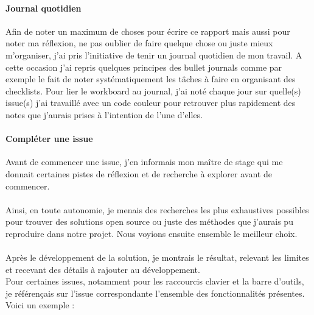 \documentclass[12pt]{article}
\begin{document}
\paragraph{Journal quotidien}
Afin de noter un maximum de choses pour écrire ce rapport mais aussi pour noter ma réflexion, ne pas oublier de faire quelque chose ou juste mieux m'organiser, j'ai pris l'initiative de tenir un journal quotidien de mon travail. A cette occasion j'ai repris quelques principes des bullet journals comme par exemple le fait de noter systématiquement les tâches à faire en organisant des checklists. Pour lier le workboard au journal, j'ai noté chaque jour sur quelle(s) issue(s) j'ai travaillé avec un code couleur pour retrouver plus rapidement des notes que j'aurais prises à l'intention de l'une d'elles.\\

\paragraph{Compléter une issue}
Avant de commencer une issue, j'en informais mon maître de stage qui me donnait certaines pistes de réflexion et de recherche à explorer avant de commencer.
\paragraph{}
Ainsi, en toute autonomie, je menais des recherches les plus exhaustives possibles pour trouver des solutions open source ou juste des méthodes que j'aurais pu reproduire dans notre projet. Nous voyions ensuite ensemble le meilleur choix.
\paragraph{}
Après le développement de la solution, je montrais le résultat, relevant les limites et recevant des détails à rajouter au développement.\\
Pour certaines issues, notamment pour les raccourcis clavier et la barre d'outils, je référençais sur l'issue correspondante l'ensemble des fonctionnalités présentes. Voici un exemple :
\end{document}
